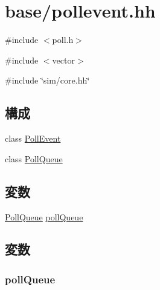\hypertarget{pollevent_8hh}{
\section{base/pollevent.hh}
\label{pollevent_8hh}
}
{\ttfamily \#include $<$poll.h$>$}\par
{\ttfamily \#include $<$vector$>$}\par
{\ttfamily \#include \char`\"{}sim/core.hh\char`\"{}}\par
\subsection*{構成}
\begin{DoxyCompactItemize}
\item 
class \hyperlink{classPollEvent}{PollEvent}
\item 
class \hyperlink{classPollQueue}{PollQueue}
\end{DoxyCompactItemize}
\subsection*{変数}
\begin{DoxyCompactItemize}
\item 
\hyperlink{classPollQueue}{PollQueue} \hyperlink{pollevent_8hh_a6d9704e1e32950ea3b587e96e8873739}{pollQueue}
\end{DoxyCompactItemize}


\subsection{変数}
\hypertarget{pollevent_8hh_a6d9704e1e32950ea3b587e96e8873739}{
\subsubsection[{pollQueue}]{ {\bf pollQueue}}}
\label{pollevent_8hh_a6d9704e1e32950ea3b587e96e8873739}
